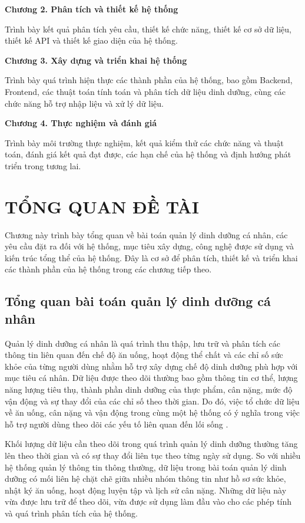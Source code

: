 \documentclass[12pt, a4paper]{report}
\begin{document}
\textbf{Chương 2. Phân tích và thiết kế hệ thống}

Trình bày kết quả phân tích yêu cầu, thiết kế chức năng, thiết kế cơ sở dữ liệu, thiết kế API và thiết kế giao diện của hệ thống.

\textbf{Chương 3. Xây dựng và triển khai hệ thống}

Trình bày quá trình hiện thực các thành phần của hệ thống, bao gồm Backend, Frontend, các thuật toán tính toán và phân tích dữ liệu dinh dưỡng, cùng các chức năng hỗ trợ nhập liệu và xử lý dữ liệu.

\textbf{Chương 4. Thực nghiệm và đánh giá}

Trình bày môi trường thực nghiệm, kết quả kiểm thử các chức năng và thuật toán, đánh giá kết quả đạt được, các hạn chế của hệ thống và định hướng phát triển trong tương lai.


\chapter{TỔNG QUAN ĐỀ TÀI}
Chương này trình bày tổng quan về bài toán quản lý dinh dưỡng cá nhân, các yêu cầu đặt ra đối với hệ thống, mục tiêu xây dựng, công nghệ được sử dụng và kiến trúc tổng thể của hệ thống. Đây là cơ sở để phân tích, thiết kế và triển khai các thành phần của hệ thống trong các chương tiếp theo.

\section{Tổng quan bài toán quản lý dinh dưỡng cá nhân}Quản lý dinh dưỡng cá nhân là quá trình thu thập, lưu trữ và phân tích các thông tin liên quan đến chế độ ăn uống, hoạt động thể chất và các chỉ số sức khỏe của từng người dùng nhằm hỗ trợ xây dựng chế độ dinh dưỡng phù hợp với mục tiêu cá nhân. Dữ liệu được theo dõi thường bao gồm thông tin cơ thể, lượng năng lượng tiêu thụ, thành phần dinh dưỡng của thực phẩm, cân nặng, mức độ vận động và sự thay đổi của các chỉ số theo thời gian. Do đó, việc tổ chức dữ liệu về ăn uống, cân nặng và vận động trong cùng một hệ thống có ý nghĩa trong việc hỗ trợ người dùng theo dõi các yếu tố liên quan đến lối sống \cite{who_healthy_lifestyle}.

Khối lượng dữ liệu cần theo dõi trong quá trình quản lý dinh dưỡng thường tăng lên theo thời gian và có sự thay đổi liên tục theo từng ngày sử dụng. So với nhiều hệ thống quản lý thông tin thông thường, dữ liệu trong bài toán quản lý dinh dưỡng có mối liên hệ chặt chẽ giữa nhiều nhóm thông tin như hồ sơ sức khỏe, nhật ký ăn uống, hoạt động luyện tập và lịch sử cân nặng. Những dữ liệu này vừa được lưu trữ để theo dõi, vừa được sử dụng làm đầu vào cho các phép tính và quá trình phân tích của hệ thống.
\end{document}
